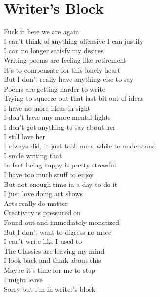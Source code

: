 \documentclass[12pt, b5paper, oneside]{book}
\begin{document}
\section{Writer's Block}
Fuck it here we are again
\\I can't think of anything offensive I can justify
\\I can no longer satisfy my desires
\\Writing poems are feeling like retirement
\\It's to compensate for this lonely heart
\\But I don't really have anything else to say
\\Poems are getting harder to write
\\Trying to squeeze out that last bit out of ideas
\\I have no more ideas in sight
\\I don't have any more mental fights
\\I don't got anything to say about her
\\I still love her
\\I always did, it just took me a while to understand
\\I smile writing that
\\In fact being happy is pretty stressful
\\I have too much stuff to enjoy
\\But not enough time in a day to do it
\\I just love doing art shows
\\Arts really do matter
\\Creativity is pressured on
\\Found out and immediately monetized
\\But I don't want to digress no more
\\I can't write like I used to
\\The Classics are leaving my mind
\\I look back and think about this
\\Maybe it's time for me to stop
\\I might leave
\\Sorry but I'm in writer's block 
\newpage
\end{document}
